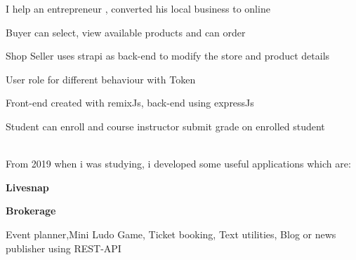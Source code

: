 \documentclass[]{deedy-resume-openfont}
\begin{document}
\begin{minipage}[t]{0.66\textwidth}
\begin{tightemize}
\item I help an entrepreneur , converted his local business to online
\item Buyer can select, view available products and can order
\item Shop Seller uses strapi as back-end to modify the store and product details
\end{tightemize}
\sectionsep

\begin{tightemize}
\item User role for different behaviour with Token
\item Front-end created with remixJs, back-end using expressJs
\item Student can enroll and course instructor submit grade on enrolled student
\end{tightemize}
\sectionsep

\sectionsep \\
From 2019 when i was studying, i developed some useful applications which are:\\
\begin{tightemize}
\item \textbf{Livesnap}
\item \textbf{Brokerage} 
\end{tightemize}
Event planner,Mini Ludo Game, Ticket booking, Text utilities, Blog or news publisher using REST-API
\sectionsep

\end{minipage}%
\hfill
\end{document}
